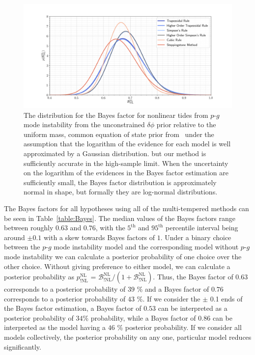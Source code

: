 \begin{figure}[th]
\centering
\includegraphics[width=1.0\textwidth]{figs/chapter6/multi_temper_bayes_lsc_sim_uni_ceos.png}
\caption{The distribution for the Bayes factor for nonlinear tides from $p$-$g$ mode instability from the unconstrained $\delta \phi$ prior relative to the uniform mass, common equation of state prior from~\cite{de2018tidal} under the assumption that the logarithm of the evidence for each model is well approximated by a Gaussian distribution.  but our method is sufficiently accurate in the high-sample limit. When the uncertainty on the logarithm of the evidences in the Bayes factor estimation are sufficiently small, the Bayes factor distribution is approximately normal in shape, but formally they are log-normal distributions.}
\label{fig:lvc_sim_uni_ceos_bayes_distr}
\end{figure}

The Bayes factors for all hypotheses using all of the multi-tempered methods can be seen in Table~\ref{table:Bayes}. The median values of the Bayes factors range between roughly $0.63$ and $0.76$, with the $5^{\mathrm{th}}$ and $95^{\mathrm{th}}$ percentile interval being  around $\pm 0.1$ with a skew towards Bayes factors of $1$. Under a binary choice between the $p$-$g$ mode instability model and the corresponding model without $p$-$g$ mode instability we can calculate a posterior probability of one choice over the other choice. Without giving preference to either model, we can calculate a posterior probability as $p^{\mathrm{NL}}_{\mathrm{!NL}}$ = $\mathcal{B}^{\mathrm{NL}}_{\mathrm{!NL}} / ( 1 + \mathcal{B}^{\mathrm{NL}}_{\mathrm{!NL}})$. Thus, the Bayes factor of $0.63$ corresponds to a posterior probability of $39$ \%  and a Bayes factor of $0.76$ corresponds to a posterior probability of $43$ \%. If we consider the $\pm$ 0.1 ends of the Bayes factor estimation, a Bayes factor of $0.53$ can be interpreted as a posterior probability of $34$\% probability, while a Bayes factor of $0.86$ can be interpreted as the model having a $46$ \% posterior probability. If we consider all models collectively, the posterior probability on any one, particular model reduces significantly.

